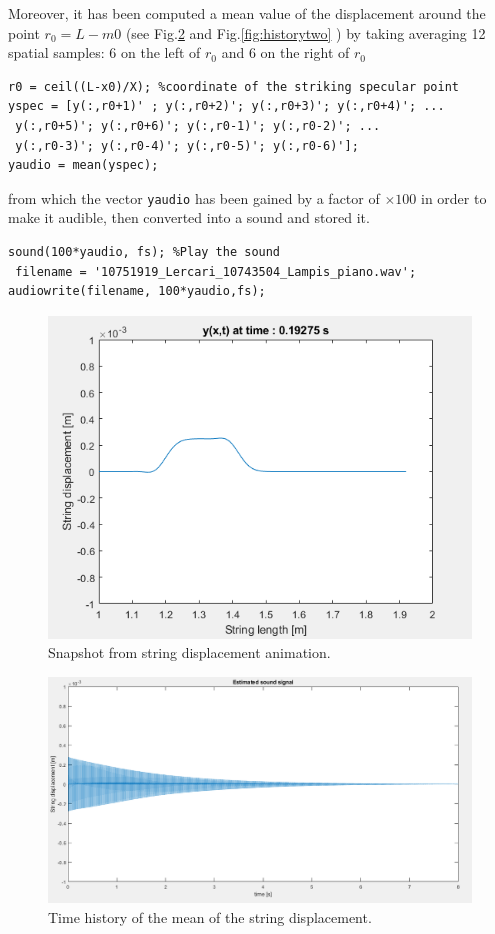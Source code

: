\documentclass[a4paper]{article}
\begin{document}
Moreover, it has been computed a mean value of the displacement around the point $r_0 = L - m0$ (see Fig.\ref{fig:historyone} and Fig.\ref{fig:historytwo} ) by taking averaging 12 spatial samples: 6 on the left of $r_0$ and 6 on the right of $r_0$

\begin{verbatim}
r0 = ceil((L-x0)/X); %coordinate of the striking specular point
yspec = [y(:,r0+1)' ; y(:,r0+2)'; y(:,r0+3)'; y(:,r0+4)'; ...
 y(:,r0+5)'; y(:,r0+6)'; y(:,r0-1)'; y(:,r0-2)'; ...
 y(:,r0-3)'; y(:,r0-4)'; y(:,r0-5)'; y(:,r0-6)'];
yaudio = mean(yspec);
\end{verbatim}

from which the vector \verb|yaudio| has been gained by a factor of $\times 100$ in order to make it audible, then converted into a sound and stored it.

\begin{verbatim}
sound(100*yaudio, fs); %Play the sound
 filename = '10751919_Lercari_10743504_Lampis_piano.wav';
audiowrite(filename, 100*yaudio,fs); 
\end{verbatim}

 \begin{figure}[h]
	\centering
	\includegraphics[width=0.75\linewidth]{displacement.png}
	\caption{Snapshot from string displacement animation.}
	\label{fig:displ}
\end{figure}

 \begin{figure}[h]
	\centering
	\includegraphics[width=0.75\linewidth]{sound_two.png}
	\caption{Time history of the mean of the string displacement.}
	\label{fig:historyone}
\end{figure}
\end{document}

